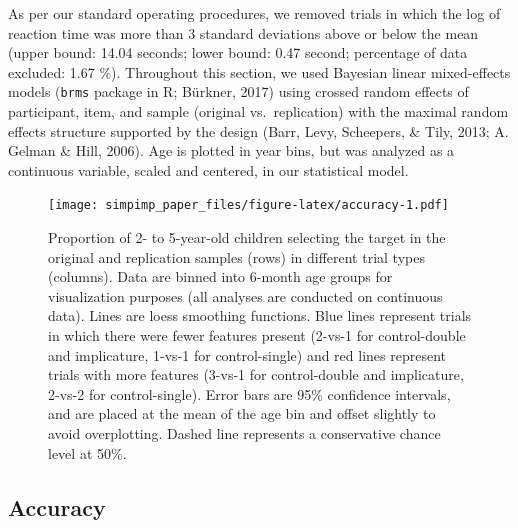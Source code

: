 \documentclass[man]{apa6}
\begin{document}
As per our standard operating procedures, we removed trials in which the
log of reaction time was more than 3 standard deviations above or below
the mean (upper bound: 14.04 seconds; lower bound: 0.47 second;
percentage of data excluded: 1.67 \%). Throughout this section, we used
Bayesian linear mixed-effects models (\texttt{brms} package in R;
Bürkner, 2017) using crossed random effects of participant, item, and
sample (original vs.~replication) with the maximal random effects
structure supported by the design (Barr, Levy, Scheepers, \& Tily, 2013;
A. Gelman \& Hill, 2006). Age is plotted in year bins, but was analyzed
as a continuous variable, scaled and centered, in our statistical model.

\begin{figure}
\centering
\texttt{[image: simpimp\_paper\_files/figure-latex/accuracy-1.pdf]}
\caption{\label{fig:accuracy}Proportion of 2- to 5-year-old children
selecting the target in the original and replication samples (rows) in
different trial types (columns). Data are binned into 6-month age groups
for visualization purposes (all analyses are conducted on continuous
data). Lines are loess smoothing functions. Blue lines represent trials
in which there were fewer features present (2-vs-1 for control-double
and implicature, 1-vs-1 for control-single) and red lines represent
trials with more features (3-vs-1 for control-double and implicature,
2-vs-2 for control-single). Error bars are 95\% confidence intervals,
and are placed at the mean of the age bin and offset slightly to avoid
overplotting. Dashed line represents a conservative chance level at
50\%.}
\end{figure}

\subsection{Accuracy}\label{accuracy}
\end{document}

